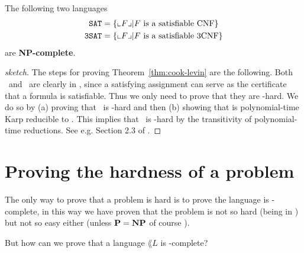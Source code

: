 \begin{theorem}
	The following two languages
	\begin{align*}
		\SAT     & = \{\llcorner F\lrcorner | F \text{ is a satisfiable CNF}\}  \\
		\kSAT{3} & = \{\llcorner F\lrcorner | F \text{ is a satisfiable 3CNF}\}
	\end{align*}
	are \textbf{NP-complete}.
	\label{thm:cook-levin}
\end{theorem}
\begin{proof}[sketch]
	The steps for proving Theorem~\ref{thm:cook-levin} are the following.
	Both \SAT~and ~are clearly in \NP, since a satisfying assignment can serve as the certificate that a formula is satisfiable. Thus we only need to prove that they are \NP-hard. We do so by (a) proving that \SAT~is \NP-hard and then (b) showing that \SAT is polynomial-time Karp reducible to . This implies that ~is \NP-hard by the transitivity of polynomial-time reductions. See e.g. Section 2.3 of \citet{Arora2009}.
\end{proof}

\section{Proving the hardness of a problem}

The only way to prove that a problem is hard is to prove the language is \NP-complete, in this way we have proven that the problem is not so hard (being in \NP) but not so easy either (unless $\textbf{P} = \textbf{NP}$ of course ).

But how can we prove that a language \(\lang{L}\) is \NP-complete?\\

